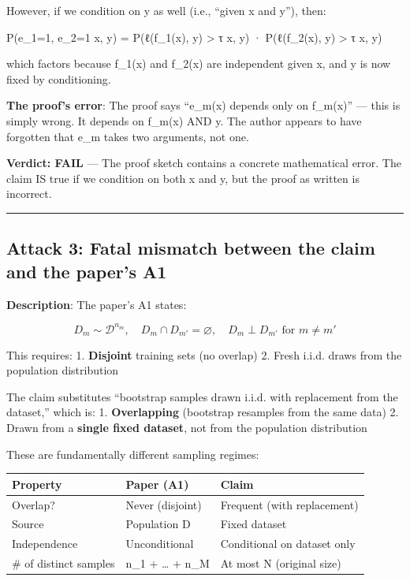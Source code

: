 \documentclass[
  12pt,
]{ctexart}
\begin{document}
However, if we condition on y as well (i.e., ``given x and y''), then:

P(e\_1=1, e\_2=1 \textbar{} x, y) = P(ℓ(f\_1(x), y) \textgreater{} τ
\textbar{} x, y) · P(ℓ(f\_2(x), y) \textgreater{} τ \textbar{} x, y)

which factors because f\_1(x) and f\_2(x) are independent given x, and y
is now fixed by conditioning.

\textbf{The proof's error}: The proof says ``e\_m(x) depends only on
f\_m(x)'' --- this is simply wrong. It depends on f\_m(x) AND y. The
author appears to have forgotten that e\_m takes two arguments, not one.

\textbf{Verdict: FAIL} --- The proof sketch contains a concrete
mathematical error. The claim IS true if we condition on both x and y,
but the proof as written is incorrect.

\begin{center}\rule{0.5\linewidth}{0.5pt}\end{center}

\subsection{Attack 3: Fatal mismatch between the claim and the paper's
A1}\label{attack-3-fatal-mismatch-between-the-claim-and-the-papers-a1}

\textbf{Description}: The paper's A1 states:

\[D_m \sim \mathcal{D}^{n_m}, \quad D_m \cap D_{m'} = \varnothing, \quad D_m \perp D_{m'} \text{ for } m \neq m'\]

This requires: 1. \textbf{Disjoint} training sets (no overlap) 2. Fresh
i.i.d. draws from the population distribution

The claim substitutes ``bootstrap samples drawn i.i.d. with replacement
from the dataset,'' which is: 1. \textbf{Overlapping} (bootstrap
resamples from the same data) 2. Drawn from a \textbf{single fixed
dataset}, not from the population distribution

These are fundamentally different sampling regimes:

\begin{longtable}[]{@{}lll@{}}
\toprule\noalign{}
Property & Paper (A1) & Claim \\
\midrule\noalign{}
\endhead
\bottomrule\noalign{}
\endlastfoot
Overlap? & Never (disjoint) & Frequent (with replacement) \\
Source & Population D & Fixed dataset \\
Independence & Unconditional & Conditional on dataset only \\
\# of distinct samples & n\_1 + \ldots{} + n\_M & At most N (original
size) \\
\end{longtable}
\end{document}
